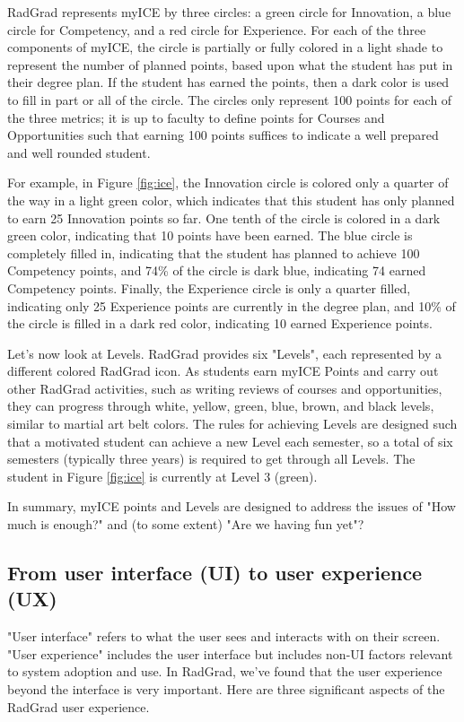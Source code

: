 \documentclass[acmsmall]{acmart}
\begin{document}
RadGrad represents myICE by three circles: a green circle for Innovation, a blue circle for Competency, and a red circle for Experience. For each of the three components of myICE, the circle is partially or fully colored in a light shade to represent the number of planned points, based upon what the student has put in their degree plan. If the student has earned the points, then a dark color is used to fill in part or all of the circle. The circles only represent 100 points for each of the three metrics; it is up to faculty to define points for Courses and Opportunities such that earning 100 points suffices to indicate a well prepared and well rounded student.

For example, in Figure \ref{fig:ice}, the Innovation circle is colored only a quarter of the way in a light green color, which indicates that this student has only planned to earn 25 Innovation points so far. One tenth of the circle is colored in a dark green color, indicating that 10 points have been earned. The blue circle is completely filled in, indicating that the student has planned to achieve 100 Competency points, and 74\% of the circle is dark blue, indicating 74 earned Competency points.  Finally, the Experience circle is only a quarter filled, indicating only 25 Experience points are currently in the degree plan, and 10\% of the circle is filled in a dark red color, indicating 10 earned Experience points.

Let's now look at Levels.  RadGrad provides six "Levels", each represented by a different colored RadGrad icon. As students earn myICE Points and carry out other RadGrad activities, such as writing reviews of courses and opportunities, they can progress through white, yellow, green, blue, brown, and black levels, similar to martial art belt colors. The rules for achieving Levels are designed such that a motivated student can achieve a new Level each semester, so a total of six semesters (typically three years) is required to get through all Levels.  The student in Figure \ref{fig:ice} is currently at Level 3 (green).

In summary, myICE points and Levels are designed to address the issues of "How much is enough?" and (to some extent) "Are we having fun yet"?

\subsection{From user interface (UI) to user experience (UX)}

"User interface" refers to what the user sees and interacts with on their screen. "User experience" includes the user interface but includes non-UI factors relevant to system adoption and use.  In RadGrad, we've found that the user experience beyond the interface is very important. Here are three significant aspects of the RadGrad user experience.
\end{document}
